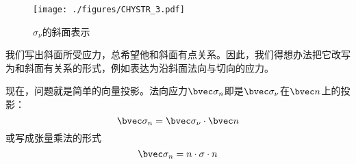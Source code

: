 \begin{figure}[ht]
\centering
\texttt{[image: ./figures/CHYSTR\_3.pdf]}
\caption{$\sigma_\nu$的斜面表示} \label{CHYSTR_fig3}
\end{figure}
我们写出斜面所受应力，总希望他和斜面有点关系。因此，我们得想办法把它改写为和斜面有关系的形式，例如表达为沿斜面法向与切向的应力。

现在，问题就是简单的向量投影。法向应力$\bvec \sigma_n$即是$\bvec \sigma_\nu$在$\bvec n$上的投影：
$$\bvec \sigma_n = \bvec \sigma_\nu \cdot \bvec n $$
或写成张量乘法的形式
$$\bvec \sigma_n = n \cdot \sigma \cdot n $$
